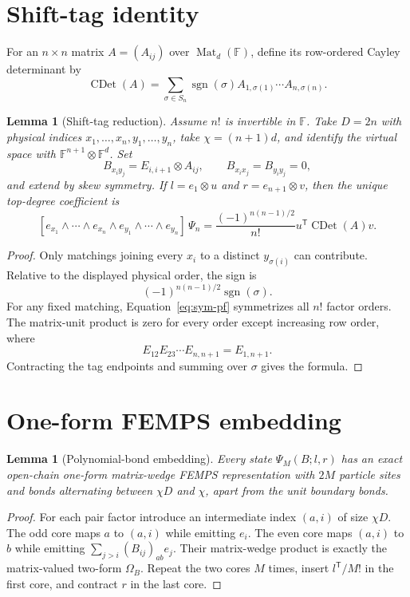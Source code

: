 \documentclass[11pt]{article}
\newtheorem{lemma}[theorem]{Lemma}
\newcommand{\Mat}{\operatorname{Mat}}
\newcommand{\CayleyDet}{\operatorname{CDet}}
\begin{document}
\section{Shift-tag identity}

For an $n\times n$ matrix $A=(A_{ij})$ over $\Mat_d(\mathbb F)$, define its
row-ordered Cayley determinant by
\[
  \CayleyDet(A)=\sum_{\sigma\in S_n}\operatorname{sgn}(\sigma)
  A_{1,\sigma(1)}\cdots A_{n,\sigma(n)}.
\]

\begin{lemma}[Shift-tag reduction]
Assume $n!$ is invertible in $\mathbb F$. Take $D=2n$ with physical indices
$x_1,\ldots,x_n,y_1,\ldots,y_n$, take $\chi=(n+1)d$, and identify the
virtual space with $\mathbb F^{n+1}\otimes\mathbb F^d$. Set
\[
 B_{x_i y_j}=E_{i,i+1}\otimes A_{ij},
 \qquad B_{x_ix_j}=B_{y_i y_j}=0,
\]
and extend by skew symmetry. If $l=e_1\otimes u$ and
$r=e_{n+1}\otimes v$, then the unique top-degree coefficient is
\[
  [e_{x_1}\wedge\cdots\wedge e_{x_n}\wedge
    e_{y_1}\wedge\cdots\wedge e_{y_n}]\,\Psi_n
  =\frac{(-1)^{n(n-1)/2}}{n!}
    u^{\mathsf T}\CayleyDet(A)v.
\]
\end{lemma}

\begin{proof}
Only matchings joining every $x_i$ to a distinct $y_{\sigma(i)}$ can
contribute. Relative to the displayed physical order, the sign is
\[
 (-1)^{n(n-1)/2}\operatorname{sgn}(\sigma).
\]
For any fixed
matching, Equation~\eqref{eq:sym-pf} symmetrizes all $n!$ factor orders.
The matrix-unit product is zero for every order except increasing row order,
where
\[
 E_{12}E_{23}\cdots E_{n,n+1}=E_{1,n+1}.
\]
Contracting the tag endpoints and summing over $\sigma$ gives the formula.
\end{proof}

\section{One-form FEMPS embedding}

\begin{lemma}[Polynomial-bond embedding]
Every state $\Psi_M(B;l,r)$ has an exact open-chain one-form matrix-wedge
FEMPS representation with $2M$ particle sites and bonds alternating between
$\chi D$ and $\chi$, apart from the unit boundary bonds.
\end{lemma}

\begin{proof}
For each pair factor introduce an intermediate index $(a,i)$ of size
$\chi D$. The odd core maps $a$ to $(a,i)$ while emitting $e_i$. The even
core maps $(a,i)$ to $b$ while emitting
$\sum_{j>i}(B_{ij})_{ab}e_j$. Their matrix-wedge product is exactly the
matrix-valued two-form $\Omega_B$. Repeat the two cores $M$ times, insert
$l^{\mathsf T}/M!$ in the first core, and contract $r$ in the last core.
\end{proof}
\end{document}
